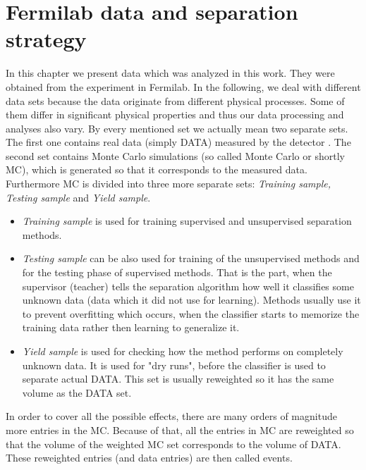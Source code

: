 \chapter{Fermilab data and separation strategy}\label{ch:FNAL_data}

In this chapter we present data which was analyzed in this work. They were obtained from the experiment \dzero in Fermilab. In the following, we deal with different data sets because the data originate from different physical processes. Some of them differ in significant physical properties and thus our data processing and analyses also vary. By every mentioned set we actually mean two separate sets. The first one contains real data (simply DATA) measured by the detector \dzero. The second set contains Monte Carlo simulations (so called Monte Carlo or shortly MC), which is generated so that it corresponds to the measured data. Furthermore MC is divided into three more separate sets: {\em Training sample, Testing sample} and {\em Yield sample}. 
\begin{itemize}
\item {\em Training sample} is used for training supervised and unsupervised separation methods. 
\item {\em Testing sample} can be also used for training of the unsupervised methods and for the testing phase of supervised methods. That is the part, when the supervisor (teacher) tells the separation algorithm how well it classifies some unknown data (data which it did not use for learning). Methods usually use it to prevent overfitting which occurs, when the classifier starts to memorize the training data rather then learning to generalize it.
\item {\em Yield sample} is used for checking how the method performs on completely unknown data. It is used for "dry runs", before the classifier is used to separate actual DATA. This set is usually reweighted so it has the same volume as the DATA set.
\end{itemize}

In order to cover all the possible effects, there are many orders of magnitude more entries in the MC. Because of that, all the entries in MC are reweighted so that the volume of the weighted MC set corresponds to the volume of DATA. These reweighted entries (and data entries) are then called events.

